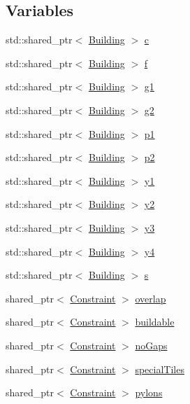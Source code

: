 \subsection*{Variables}
\begin{DoxyCompactItemize}
\item 
std\-::shared\-\_\-ptr$<$ \hyperlink{classghost_1_1Building}{Building} $>$ \hyperlink{namespaceghost_a1e04a626798fce7a46db973e9693354e}{c}
\item 
std\-::shared\-\_\-ptr$<$ \hyperlink{classghost_1_1Building}{Building} $>$ \hyperlink{namespaceghost_a79c82e0d4f18942474a997e6421358f4}{f}
\item 
std\-::shared\-\_\-ptr$<$ \hyperlink{classghost_1_1Building}{Building} $>$ \hyperlink{namespaceghost_a69c92ddb4f46d01dc2b21ff8b6c7abdd}{g1}
\item 
std\-::shared\-\_\-ptr$<$ \hyperlink{classghost_1_1Building}{Building} $>$ \hyperlink{namespaceghost_a06d6bb1ff9795198ea63e209711cfc9e}{g2}
\item 
std\-::shared\-\_\-ptr$<$ \hyperlink{classghost_1_1Building}{Building} $>$ \hyperlink{namespaceghost_ad597936cfadde60ce8c6ed70f14c242c}{p1}
\item 
std\-::shared\-\_\-ptr$<$ \hyperlink{classghost_1_1Building}{Building} $>$ \hyperlink{namespaceghost_a47f813abed554f342cbabdd87c34a89e}{p2}
\item 
std\-::shared\-\_\-ptr$<$ \hyperlink{classghost_1_1Building}{Building} $>$ \hyperlink{namespaceghost_af02ccfe4153013ca001f67b21cb8ba43}{y1}
\item 
std\-::shared\-\_\-ptr$<$ \hyperlink{classghost_1_1Building}{Building} $>$ \hyperlink{namespaceghost_ab6fc6f6a8069edbc2ae66e3f4c95e988}{y2}
\item 
std\-::shared\-\_\-ptr$<$ \hyperlink{classghost_1_1Building}{Building} $>$ \hyperlink{namespaceghost_a48fd5802a1f5deeffa729a4be630b172}{y3}
\item 
std\-::shared\-\_\-ptr$<$ \hyperlink{classghost_1_1Building}{Building} $>$ \hyperlink{namespaceghost_a959bf3d4c6eabc2dda3faeed7e7ea7a9}{y4}
\item 
std\-::shared\-\_\-ptr$<$ \hyperlink{classghost_1_1Building}{Building} $>$ \hyperlink{namespaceghost_a21eab9fd4ae07c7db20e824cc4452a97}{s}
\item 
shared\-\_\-ptr$<$ \hyperlink{classghost_1_1Constraint}{Constraint} $>$ \hyperlink{namespaceghost_a7a91cd37137a7eae220126fcbb8ff96b}{overlap}
\item 
shared\-\_\-ptr$<$ \hyperlink{classghost_1_1Constraint}{Constraint} $>$ \hyperlink{namespaceghost_aed6c0dcd76842d41ca1a81a6b4301247}{buildable}
\item 
shared\-\_\-ptr$<$ \hyperlink{classghost_1_1Constraint}{Constraint} $>$ \hyperlink{namespaceghost_a4b6df9d0b61991e356eb28353a73be30}{no\-Gaps}
\item 
shared\-\_\-ptr$<$ \hyperlink{classghost_1_1Constraint}{Constraint} $>$ \hyperlink{namespaceghost_a41140633099e7f2158ce39ca3a469abb}{special\-Tiles}
\item 
shared\-\_\-ptr$<$ \hyperlink{classghost_1_1Constraint}{Constraint} $>$ \hyperlink{namespaceghost_a381584b094da85f582a9b24eedf21411}{pylons}
\end{DoxyCompactItemize}


